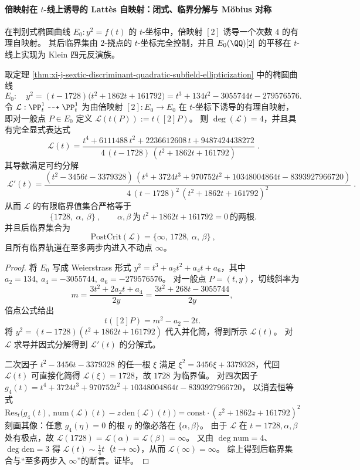 \paragraph{倍映射在 \texorpdfstring{$t$}{t}-线上诱导的 Latt\`es 自映射：闭式、临界分解与 Möbius 对称}
在判别式椭圆曲线 \(E_0:y^2=f(t)\) 的 \(t\)-坐标中，倍映射 \([2]\) 诱导一个次数 \(4\) 的有理自映射。
其后临界集由 \(2\)-挠点的 \(t\)-坐标完全控制，并且 \(E_0(\QQ)[2]\) 的平移在 \(t\)-线上实现为 Klein 四元反演族。

\begin{theorem}\label{thm:xi-j-sextic-elliptic-lattes-t-doubling-pcf}
取定理 \ref{thm:xi-j-sextic-discriminant-quadratic-subfield-ellipticization} 中的椭圆曲线
\[
E_0:\quad y^2=(t-1728)\bigl(t^2+1862t+161792\bigr)
=t^3+134t^2-3055744t-279576576.
\]
令 \(\mathcal L:\PP^1_t\dashrightarrow \PP^1_t\) 为由倍映射 \([2]:E_0\to E_0\) 在 \(t\)-坐标下诱导的有理自映射，即对一般点 \(P\in E_0\) 定义
\(
\mathcal L(t(P)):=t([2]P)
\)。
则 \(\deg(\mathcal L)=4\)，并且具有完全显式表达式
\[
\boxed{\;
\mathcal L(t)=
\frac{t^{4}+6111488\,t^{2}+2236612608\,t+9487424438272}
{4\,(t-1728)\,(t^{2}+1862t+161792)}\; }.
\]
其导数满足可约分解
\[
\boxed{\;
\mathcal L'(t)=
\frac{(t^{2}-3456t-3379328)\,
(t^{4}+3724t^{3}+970752t^{2}+10348004864t-8393927966720)}
{4\,(t-1728)^{2}\,(t^{2}+1862t+161792)^{2}}\; }.
\]
从而 \(\mathcal L\) 的有限临界值集合严格等于
\[
\boxed{\ \{1728,\ \alpha,\ \beta\}\ },
\qquad
\alpha,\beta\ \text{为}\ t^{2}+1862t+161792=0\ \text{的两根}.
\]
并且后临界集合为
\[
\boxed{\ \mathrm{PostCrit}(\mathcal L)=\{\infty,\,1728,\,\alpha,\,\beta\}\ },
\]
且所有临界轨道在至多两步内进入不动点 \(\infty\)。
\end{theorem}
\begin{proof}
将 \(E_0\) 写成 Weierstrass 形式 \(y^2=t^3+a_2t^2+a_4t+a_6\)，其中
\(
a_2=134,\ a_4=-3055744,\ a_6=-279576576
\)。
对一般点 \(P=(t,y)\)，切线斜率为
\[
m=\frac{3t^{2}+2a_2t+a_4}{2y}=\frac{3t^{2}+268t-3055744}{2y},
\]
倍点公式给出
\[
t([2]P)=m^{2}-a_2-2t.
\]
将 \(y^2=(t-1728)(t^2+1862t+161792)\) 代入并化简，得到所示 \(\mathcal L(t)\)。
对 \(\mathcal L\) 求导并因式分解得到 \(\mathcal L'(t)\) 的分解式。
\par
二次因子 \(t^{2}-3456t-3379328\) 的任一根 \(\xi\) 满足 \(\xi^{2}=3456\xi+3379328\)，代回 \(\mathcal L(t)\) 可直接化简得 \(\mathcal L(\xi)=1728\)，故 \(1728\) 为临界值。
对四次因子 \(g_4(t)=t^{4}+3724t^{3}+970752t^{2}+10348004864t-8393927966720\)，
以消去恒等式
\[
\mathrm{Res}_{t}\!\bigl(g_4(t),\,\mathrm{num}(\mathcal L)(t)-z\,\mathrm{den}(\mathcal L)(t)\bigr)
=\mathrm{const}\cdot(z^{2}+1862z+161792)^{2}
\]
刻画其像：任意 \(g_4(\eta)=0\) 的根 \(\eta\) 的像必落在 \(\{\alpha,\beta\}\)。
由于 \(\mathcal L\) 在 \(t=1728,\alpha,\beta\) 处有极点，故 \(\mathcal L(1728)=\mathcal L(\alpha)=\mathcal L(\beta)=\infty\)。
又由 \(\deg\mathrm{num}=4\)、\(\deg\mathrm{den}=3\) 得 \(\mathcal L(t)\sim \frac14 t\)（\(t\to\infty\)），从而 \(\mathcal L(\infty)=\infty\)。
综上得到后临界集合与“至多两步入 \(\infty\)”的断言。证毕。
\end{proof}

